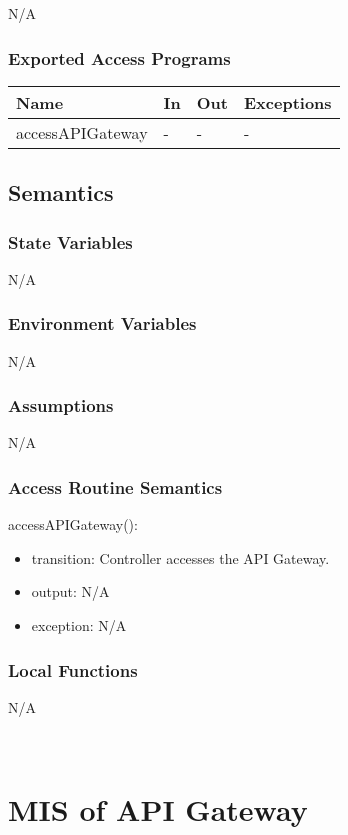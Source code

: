 \documentclass[12pt, titlepage]{article}
\begin{document}
N/A

\subsubsection{Exported Access Programs}

\begin{center}
\begin{tabular}{p{8cm} p{4cm} p{2cm} p{2cm}}
\hline
\textbf{Name} & \textbf{In} & \textbf{Out} & \textbf{Exceptions} \\
\hline
accessAPIGateway & - & - & - \\
\hline
\end{tabular}
\end{center}

\subsection{Semantics}

\subsubsection{State Variables}
N/A

\subsubsection{Environment Variables}
N/A

\subsubsection{Assumptions}
N/A

\subsubsection{Access Routine Semantics}

\noindent accessAPIGateway():
\begin{itemize}
\item transition: Controller accesses the API Gateway.
\item output: N/A
\item exception: N/A
\end{itemize}

\subsubsection{Local Functions}
N/A

~\newpage
\section{MIS of API Gateway \label{mAppController} }
\end{document}
